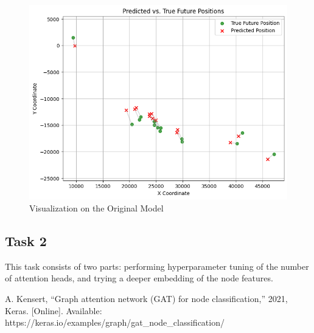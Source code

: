 \documentclass[conference]{IEEEtran}
\begin{document}
\begin{figure}[htbp]
    \centering
    \includegraphics[width=0.8\linewidth]{figvisual1.png}
    \caption{Visualization on the Original Model}
    \label{fig:visual1}
\end{figure}

\subsection*{Task 2}

This task consists of two parts: performing hyperparameter tuning of the number
of attention heads, and trying a deeper embedding of the node features. 

\begin{thebibliography}{00}
 A. Kensert, “Graph attention network (GAT) for node
    classification,” 2021, Keras. [Online]. Available:
    https://keras.io/examples/graph/gat\_node\_classification/
\end{thebibliography}
\end{document}
